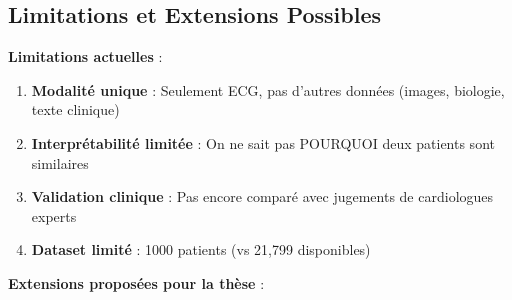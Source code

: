 \documentclass[12pt,a4paper]{article}
\begin{document}
\subsection{Limitations et Extensions Possibles}

\textbf{Limitations actuelles} :

\begin{enumerate}
    \item \textbf{Modalité unique} : Seulement ECG, pas d'autres données (images, biologie, texte clinique)
    \item \textbf{Interprétabilité limitée} : On ne sait pas POURQUOI deux patients sont similaires
    \item \textbf{Validation clinique} : Pas encore comparé avec jugements de cardiologues experts
    \item \textbf{Dataset limité} : 1000 patients (vs 21,799 disponibles)
\end{enumerate}

\textbf{Extensions proposées pour la thèse} :
\end{document}
